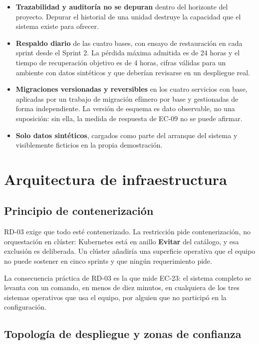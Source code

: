 \documentclass[11pt,a4paper]{article}
\newcommand{\evitar}{\textcolor{ringEvitar}{\textbf{Evitar}}}
\begin{document}
\begin{itemize}
\item \textbf{Trazabilidad y auditoría no se depuran} dentro del horizonte del proyecto. Depurar el historial de una unidad destruye la capacidad que el sistema existe para ofrecer.
\item \textbf{Respaldo diario} de las cuatro bases, con ensayo de restauración en cada sprint desde el Sprint 2. La pérdida máxima admitida es de 24 horas y el tiempo de recuperación objetivo es de 4 horas, cifras válidas para un ambiente con datos sintéticos y que deberían revisarse en un despliegue real.
\item \textbf{Migraciones versionadas y reversibles} en los cuatro servicios con base, aplicadas por un trabajo de migración efímero por base y gestionadas de forma independiente. La versión de esquema es dato observable, no una suposición: sin ella, la medida de respuesta de EC-09 no se puede afirmar.
\item \textbf{Solo datos sintéticos}, cargados como parte del arranque del sistema y visiblemente ficticios en la propia demostración.
\end{itemize}

\section{Arquitectura de infraestructura}
\label{sec:infra}

\subsection{Principio de contenerización}

RD-03 exige que todo esté contenerizado. La restricción pide contenerización, no orquestación en clúster: Kubernetes está en anillo \evitar{} del catálogo, y esa exclusión es deliberada. Un clúster añadiría una superficie operativa que el equipo no puede sostener en cinco sprints y que ningún requerimiento pide.

La consecuencia práctica de RD-03 es la que mide EC-23: el sistema completo se levanta con un comando, en menos de diez minutos, en cualquiera de los tres sistemas operativos que usa el equipo, por alguien que no participó en la configuración.

\subsection{Topología de despliegue y zonas de confianza}
\end{document}
